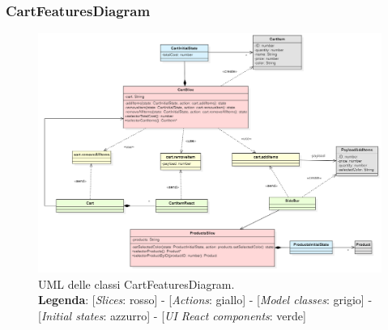 \begin{landscape}
	\thispagestyle{empty}
	\subsubsection{CartFeaturesDiagram}
	\begin{figure}[H]
		\centering
		\includegraphics[scale=0.7, keepaspectratio]{./res/images/cartFeaturesDiagram.PNG}
		\caption[UML delle classi CartFeaturesDiagram]{
		UML delle classi CartFeaturesDiagram.
		\\
		\textbf{Legenda}: 
		[\textit{Slices}: rosso] -
		[\textit{Actions}: giallo] -
		[\textit{Model classes}: grigio] -
		[\textit{Initial states}: azzurro] -
		[\textit{UI React components}: verde]}
	\end{figure}
\end{landscape}
\restoregeometry

